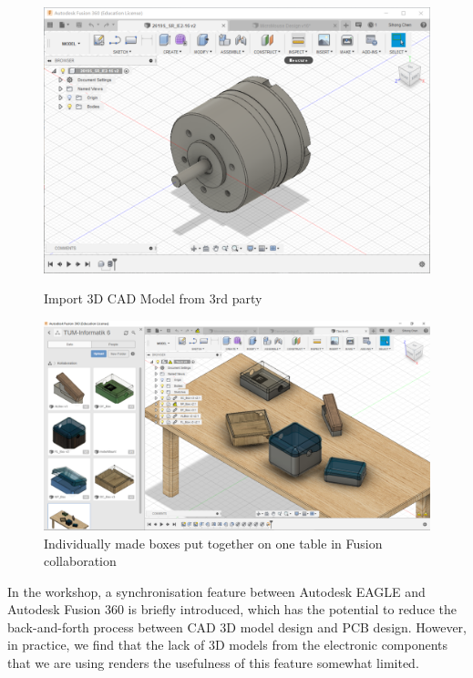 \begin{figure}[htb]
    \centering
    \begin{minipage}{.45\textwidth}
          \centering
            \includegraphics[width=.9\linewidth]{figures/Casing/FusionImport.PNG}
              \caption{Import 3D CAD Model from 3rd party}
                \label{fig:fusion_import}
    \end{minipage}
    \begin{minipage}{.45\textwidth}
          \centering
            \includegraphics[width=.9\linewidth]{figures/Casing/FusionCollaborationTable.PNG}
              \caption{Individually made boxes put together on one table in Fusion collaboration}
                \label{fig:fusion_collab_table}
    \end{minipage}
\end{figure}

\noindent
In the workshop, a synchronisation feature between Autodesk EAGLE and Autodesk Fusion 360 is briefly introduced, which has the potential to reduce the back-and-forth process between CAD 3D model design and PCB design. However, in practice, we find that the lack of 3D models from the electronic components that we are using renders the usefulness of this feature somewhat limited.

